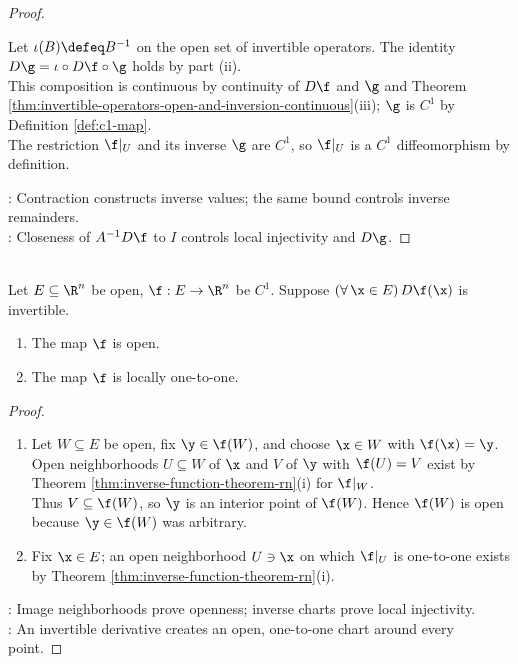 \begin{theorem}
\begin{proof}
\begin{enumerate}[label=(\roman*)]
Let $\iota(B)\defeq B^{-1}$ on the open set of invertible operators. The identity $D\g=\iota\circ D\f\circ\g$ holds by part (ii).\\
This composition is continuous by continuity of $D\f$ and $\g$ and Theorem \ref{thm:invertible-operators-open-and-inversion-continuous}(iii); $\g$ is $C^1$ by Definition \ref{def:c1-map}.\\
The restriction $\f|_U$ and its inverse $\g$ are $C^1$, so $\f|_U$ is a $C^1$ diffeomorphism by definition.
\end{enumerate}
: Contraction constructs inverse values; the same bound controls inverse remainders.\\
: Closeness of $A^{-1}D\f$ to $I$ controls local injectivity and $D\g$.
\end{proof}
\end{theorem}

\begin{corollary} \label{cor:local-diffeomorphism-open-map} \\
Let $E\subseteq\R^n$ be open, $\f:E\to\R^n$ be $C^1$. Suppose $(\forall\,\x\in E)\,D\f(\x)$ is invertible.
\begin{enumerate}[label=(\roman*)]
\setlength{\itemsep}{0pt}
\item The map $\f$ is open.
\item The map $\f$ is locally one-to-one.
\end{enumerate}
\begin{proof}
\begin{enumerate}[label=(\roman*)]
\setlength{\itemsep}{0pt}
\item Let $W\subseteq E$ be open, fix $\y\in\f(W)$, and choose $\x\in W$ with $\f(\x)=\y$.\\
Open neighborhoods $U\subseteq W$ of $\x$ and $V$ of $\y$ with $\f(U)=V$ exist by Theorem \ref{thm:inverse-function-theorem-rn}(i) for $\f|_W$.\\
Thus $V\subseteq\f(W)$, so $\y$ is an interior point of $\f(W)$. Hence $\f(W)$ is open because $\y\in\f(W)$ was arbitrary.
\item Fix $\x\in E$; an open neighborhood $U\ni\x$ on which $\f|_U$ is one-to-one exists by Theorem \ref{thm:inverse-function-theorem-rn}(i).
\end{enumerate}
: Image neighborhoods prove openness; inverse charts prove local injectivity.\\
: An invertible derivative creates an open, one-to-one chart around every point.
\end{proof}
\end{corollary}
